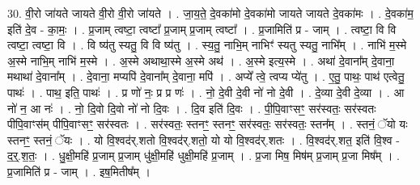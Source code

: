 \documentclass[17pt]{extarticle}
\begin{document}
30. वी॒रो जा॑यते जायते वी॒रो वी॒रो जा॑यते । . जा॒य॒ते॒ दे॒वका॑मो दे॒वका॑मो जायते जायते दे॒वका॑मः । . दे॒वका॑म॒ इति॑ दे॒व - का॒मः॒ । . प्र॒जाम् त्वष्टा॒ त्वष्टा᳚ प्र॒जाम् प्र॒जाम् त्वष्टा᳚ । . प्र॒जामिति॑ प्र - जाम् । . त्वष्टा॒ वि वि त्वष्टा॒ त्वष्टा॒ वि । . वि ष्य॑तु स्यतु॒ वि वि ष्य॑तु । . स्य॒तु॒ नाभि॒म् नाभिꣳ॑ स्यतु स्यतु॒ नाभि᳚म् । . नाभि॑ म॒स्मे अ॒स्मे नाभि॒म् नाभि॑ म॒स्मे । . अ॒स्मे अथाथा॒स्मे अ॒स्मे अथ॑ । . अ॒स्मे इत्य॒स्मे । . अथा॑ दे॒वाना᳚म् दे॒वाना॒ मथाथा॑ दे॒वाना᳚म् । . दे॒वाना॒ मप्यपि॑ दे॒वाना᳚म् दे॒वाना॒ मपि॑ । . अप्ये᳚ त्वे॒ त्वप्य प्ये॑तु । . ए॒तु॒ पाथः॒ पाथ॑ एत्वेतु॒ पाथः॑ । . पाथ॒ इति॒ पाथः॑ । . प्र णो॑ नः॒ प्र प्र णः॑ । . नो॒ दे॒वी दे॒वी नो॑ नो दे॒वी । . दे॒व्या दे॒वी दे॒व्या । . आ नो॑ न॒ आ नः॑ । . नो॒ दि॒वो दि॒वो नो॑ नो दि॒वः । . दि॒व इति॑ दि॒वः । . पी॒पि॒वाꣳसꣳ॒॒ सर॑स्वतः॒ सर॑स्वतः पीपि॒वाꣳस॑म् पीपि॒वाꣳसꣳ॒॒ सर॑स्वतः । . सर॑स्वतः॒ स्तनꣳ॒॒ स्तनꣳ॒॒ सर॑स्वतः॒ सर॑स्वतः॒ स्तन᳚म् । . स्तनं॒ ॅयो यः स्तनꣳ॒॒ स्तनं॒ ॅयः । . यो वि॒श्वद॑र्.शतो वि॒श्वद॑र्.शतो॒ यो यो वि॒श्वद॑र्.शतः । . वि॒श्वद॑र्.शत॒ इति॑ वि॒श्व - द॒र्॒.श॒तः॒ । . धु॒क्षी॒महि॑ प्र॒जाम् प्र॒जाम् धु॑क्षी॒महि॑ धुक्षी॒महि॑ प्र॒जाम् । . प्र॒जा मिष॒ मिष॑म् प्र॒जाम् प्र॒जा मिष᳚म् । . प्र॒जामिति॑ प्र - जाम् । . इष॒मितीष᳚म् । \newline
\end{document}
